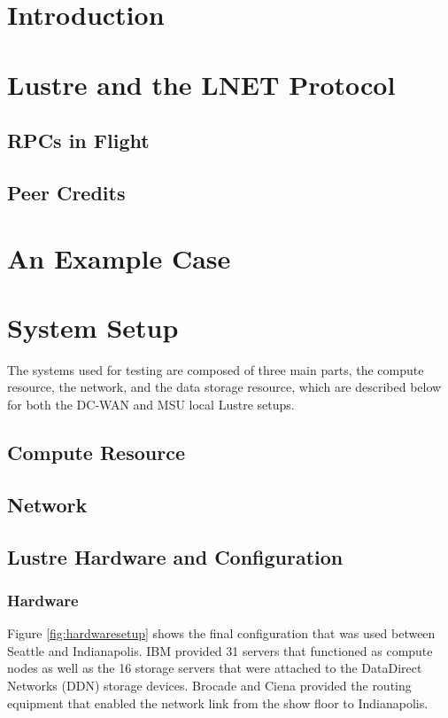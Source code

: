 \documentclass[]{sig-alternate}
\begin{document}
\section{Introduction}\label{sec:intro}


\section{Lustre and the LNET Protocol}\label{sec:LNET}

\subsection{RPCs in Flight}

\subsection{Peer Credits}
 

\section {An Example Case}\label{sec:usecase}


\section{System Setup}\label{sec:setup}
The systems used for testing are composed of three main parts, the compute resource, the network, and the data storage resource, which are described below for both the DC-WAN and MSU local Lustre setups.

\subsection{Compute Resource}



\subsection{Network}


\subsection{Lustre Hardware and Configuration}
\subsubsection{Hardware}\label{sec:hardware}

Figure \ref{fig:hardwaresetup} shows the final configuration that was used between Seattle and
Indianapolis. IBM provided 31 servers that functioned as compute nodes as well as the 16 storage servers that
were attached to the DataDirect Networks (DDN) storage devices. Brocade and Ciena provided the routing
equipment that enabled the network link from the show floor to Indianapolis.
\end{document}
